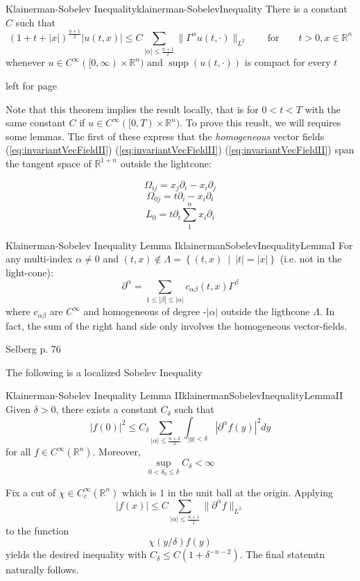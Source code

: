 \documentclass{book}
\newenvironment{Proof}[1][]
  {\begin{ProofTcb}[#1]}
  {\end{ProofTcb}}
\newcommand{\R}{{\mathbb{R}}}
\newcommand{\supp}{\operatorname{supp}}
\newcommand{\set}[2]{\left\{#1 \ \middle|\ #2\right\}}
\begin{document}
\begin{thm}{Klainerman-Sobelev Inequality}{klainerman-SobelevInequality}
	There is a constant $C$ such that
	\[
		(1 + t + |x|)^{\frac{n+1}{2}} |u(t,x)| \le C \sum_{|\alpha| \le \frac{n+1}{2}} \|\Gamma^\alpha
		u(t,\cdot)\|_{L^2} \qquad \text{for} \qquad  t > 0, x \in \R^n
	\]
	whenever $u \in C^\infty([0,\infty)\times \R^n)$ and $\supp(u(t,\cdot))$ is compact for every $t$
\end{thm}

\begin{Proof}
	left for page~\pageref{proofOfKlainerman}
\end{Proof}

Note that this theorem implies the result locally, that is for $0 < t < T$ with the same constant $C$ if $u \in
C^\infty([0, T)\times \R^n)$. To prove this reuslt, we will requires some lemmas. The first of these express that the
\emph{homogeneous} vector fields (\ref{eq:invariantVecFieldII}) (\ref{eq:invariantVecFieldII})
(\ref{eq:invariantVecFieldII}) span the tangent space of $\R^{1+n}$ outside the lightcone:

\[
	\Omega_{ij} = x_j  \partial_i - x_i  \partial_j
\]
\[
	\Omega_{0j} = t  \partial_i - x_i  \partial_t
\]
\[
	L_0 = t  \partial_t \sum_1^n x_i  \partial_i
\]

\begin{lem}{Klainerman-Sobelev Inequality Lemma I}{klainermanSobelevInequalityLemmaI}
	For any multi-index $\alpha \ne 0$ and $(t,x) \notin \Lambda = \set{(t,x)}{|t| = |x|}$ (i.e. not in the light-cone):
	\[
		\partial^\alpha = \sum_{1 \le |\beta| \le |\alpha| } c_{\alpha\beta}(t,x)\Gamma^\beta
	\]
	where $c_{\alpha\beta}$ are $C^\infty$ and homogeneous of degree -$|\alpha|$ outside the ligthcone $\Lambda$. In
	fact, the sum of the right hand side only involves the homogeneous vector-fields.
\end{lem}

\begin{Proof}
	Selberg p. 76
\end{Proof}

The following is a localized Sobelev Inequality

\begin{lem}{Klainerman-Sobelev Inequality Lemma II}{klainermanSobelevInequalityLemmaII}
	Given $\delta > 0$, there exists a constant $C_\delta$ such that
	\[
		|f(0)|^2 \le C_\delta \sum_{ |\alpha| \le \frac{n+2}{2} } \int_{|y| < \delta} |  \partial^\alpha f(y)|^2dy
	\]
	for all $f \in C^\infty(\R^n)$. Moreover,
	\[
		\sup_{0 < \delta_0 \le \delta} C_\delta < \infty
	\]
\end{lem}
\begin{Proof}
	Fix a cut of $\chi \in C_c^\infty(\R^n)$ which is $1$ in the unit ball at the origin. Applying
	\[
		|f(x)| \le C \sum_{|\alpha| \le \frac{n+1}{1}} \|  \partial^\alpha f\|_{L^2}
\]
	to the function
	\[
		\chi( y/\delta )f(y)
	\]
	yields the desired inequality with $C_\delta \le C(1 + \delta^{-n-2})$. The final statemtn naturally follows.
\end{Proof}
\end{document}
